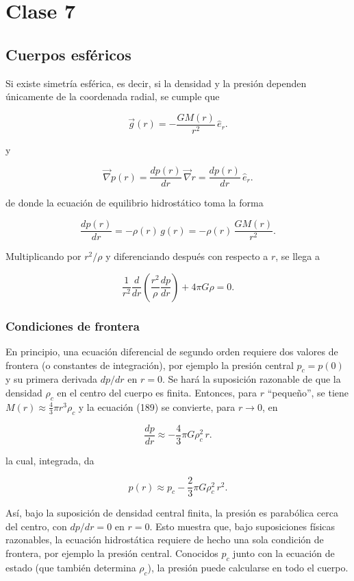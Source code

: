 \shorthandoff{<>}



\shorthandon{<>}

\chapter{Clase 7}

\section{Cuerpos esféricos}

Si existe simetría esférica, es decir, si la densidad y la presión dependen únicamente de la coordenada radial, se cumple que

$$ \vec{g}(r) = -\frac{G M(r)}{r^2}\,\hat{e}_r. $$

y

$$ \vec{\nabla}p(r) = \frac{dp(r)}{dr}\,\vec{\nabla}r = \frac{dp(r)}{dr}\,\hat{e}_r. $$

de donde la ecuación de equilibrio hidrostático toma la forma

$$ \frac{dp(r)}{dr} = -\rho(r)\,g(r) = -\rho(r)\,\frac{G M(r)}{r^2}. $$

Multiplicando por $r^2/\rho$ y diferenciando después con respecto a $r$, se llega a

$$ \frac{1}{r^2}\frac{d}{dr}\left(\frac{r^2}{\rho}\frac{dp}{dr}\right) + 4\pi G\rho = 0. $$

\subsection{Condiciones de frontera}

En principio, una ecuación diferencial de segundo orden requiere dos valores de frontera (o constantes de integración), por ejemplo la presión central $p_c = p(0)$ y su primera derivada $dp/dr$ en $r = 0$. Se hará la suposición razonable de que la densidad $\rho_c$ en el centro del cuerpo es finita. Entonces, para $r$ ``pequeño'', se tiene $M(r) \approx \frac{4}{3}\pi r^3 \rho_c$ y la ecuación (189) se convierte, para $r \to 0$, en

$$ \frac{dp}{dr} \approx -\frac{4}{3}\pi G \rho_c^2\, r. $$

la cual, integrada, da

$$ p(r) \approx p_c - \frac{2}{3}\pi G \rho_c^2\, r^2. $$

Así, bajo la suposición de densidad central finita, la presión es parabólica cerca del centro, con $dp/dr = 0$ en $r = 0$. Esto muestra que, bajo suposiciones físicas razonables, la ecuación hidrostática requiere de hecho una sola condición de frontera, por ejemplo la presión central. Conocidos $p_c$ junto con la ecuación de estado (que también determina $\rho_c$), la presión puede calcularse en todo el cuerpo.

